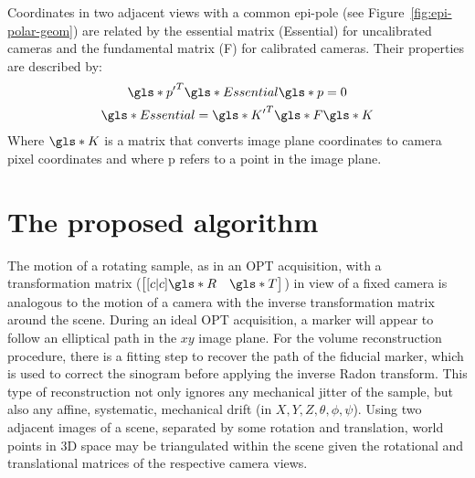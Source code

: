 \documentclass{osa-article}
\begin{document}
Coordinates in two adjacent views with a common epi-pole (see Figure~\ref{fig:epi-polar-geom}) are related by the essential matrix (\gls*{Essential}) for uncalibrated cameras and the fundamental matrix (\gls*{F}) for calibrated cameras.
Their properties are described by:
\begin{gather}
\gls*{p'}^T \gls*{Essential} \gls*{p} = 0 \label{eq:pEp}\\
\gls*{Essential} = \gls*{K'}^T \gls*{F} \gls*{K} %
\end{gather}
Where \(\gls*{K}\) is a matrix that converts image plane coordinates to camera pixel coordinates and where \gls*{p} refers to a point in the image plane.

\section*{The proposed algorithm}

The motion of a rotating sample, as in an OPT acquisition, with a transformation matrix (\( \begin{bmatrix}[c|c] \gls*{R} & \gls*{T} \end{bmatrix}\)) in view of a fixed camera is analogous to the motion of a camera with the inverse transformation matrix around the scene. %
During an ideal OPT acquisition, a marker will appear to follow an elliptical path in the \(xy\) image plane. For the volume reconstruction procedure, there is a fitting step to recover the path of the fiducial marker, which is used to correct the sinogram before applying the inverse Radon transform. This type of reconstruction not only ignores any mechanical jitter of the sample, but also any affine, systematic, mechanical drift (in \(X,Y,Z,\theta,\phi,\psi \)). %
Using two adjacent images of a scene, separated by some rotation and translation, world points in 3D space may be triangulated within the scene given the rotational and translational matrices of the respective camera views.

\end{document}
